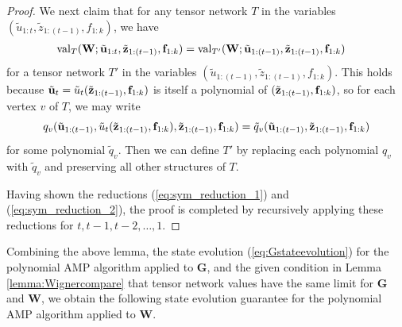 \documentclass[10pt,reqno]{amsart}
\def\W{\mathbf{W}}
\def\G{\mathbf{G}}
\def\val{\operatorname{val}}
\def\bW{{\mathbf{W}}}
\begin{document}
\begin{proof}
We next claim that for any tensor network $T$ in the variables
$(\tilde u_{1:t}, \tilde z_{1:(t-1)}, f_{1:k})$, we have
\begin{align}\label{eq:sym_reduction_2}
\val_T(\bW; \tilde\ub_{1:t}, \tilde\zb_{1:(t-1)},\fb_{1:k})
&=\val_{T'}(\bW; \tilde\ub_{1:(t-1)},\tilde\zb_{1:(t-1)}, \fb_{1:k})
\end{align}
for a tensor network $T'$ in the variables
$(\tilde u_{1:(t-1)}, \tilde z_{1:(t-1)}, f_{1:k})$. This holds because
$\tilde{\mathbf{u}}_t = \tilde u_t(\tilde{\mathbf{z}}_{1:(t-1)}, \mathbf{f}_{1:k})$ is itself a 
polynomial of $(\tilde{\mathbf{z}}_{1:(t-1)}, \mathbf{f}_{1:k})$, so for each vertex $v$ of 
$T$, we may write
\[q_v(\tilde{\mathbf{u}}_{1:(t-1)}, \tilde u_t(\tilde{\mathbf{z}}_{1:(t-1)}, \mathbf{f}_{1:k}), 
\tilde{\mathbf{z}}_{1:(t-1)}, \mathbf{f}_{1:k}) = \tilde q_v(\tilde{\mathbf{u}}_{1:(t-1)}, 
\tilde{\mathbf{z}}_{1:(t-1)}, \mathbf{f}_{1:k})\]
for some polynomial $\tilde q_v$. Then we can define $T'$ by replacing each
polynomial $q_v$ with $\tilde q_v$ and preserving all other structures of $T$.

Having shown the reductions (\ref{eq:sym_reduction_1}) and
(\ref{eq:sym_reduction_2}), the proof is completed by recursively applying
these reductions for $t,t-1,t-2,\ldots,1$.
\end{proof}

Combining the above lemma, the state evolution (\ref{eq:Gstateevolution})
for the polynomial AMP algorithm applied to $\G$, and the given condition in
Lemma \ref{lemma:Wignercompare} that
tensor network values have the same limit for $\G$ and $\W$, we obtain the
following state evolution guarantee for the polynomial AMP algorithm applied to $\W$.
\end{document}
